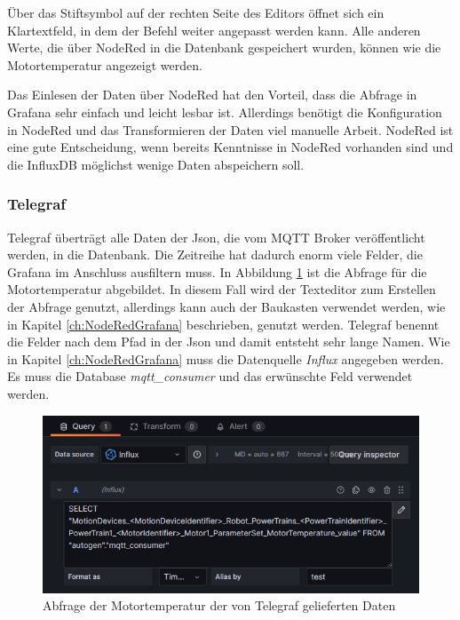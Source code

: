 \documentclass[a4paper, 12pt, oneside, toc=listofnumbered, bibliography=totoc]{scrbook}
\begin{document}
		Über das Stiftsymbol auf der rechten Seite des Editors öffnet sich ein Klartextfeld, in dem der Befehl weiter angepasst werden kann. Alle anderen Werte, die über NodeRed in die Datenbank gespeichert wurden, können wie die Motortemperatur angezeigt werden.
		
		Das Einlesen der Daten über NodeRed hat den Vorteil, dass die Abfrage in Grafana sehr einfach und leicht lesbar ist. Allerdings benötigt die Konfiguration in NodeRed und das Transformieren der Daten viel manuelle Arbeit. NodeRed ist eine gute Entscheidung, wenn bereits Kenntnisse in NodeRed vorhanden sind und die InfluxDB möglichst wenige Daten abspeichern soll. 
		
		\subsubsection{Telegraf}
		
		Telegraf überträgt alle Daten der Json, die vom MQTT Broker veröffentlicht werden, in die Datenbank. Die Zeitreihe hat dadurch enorm viele Felder, die Grafana im Anschluss ausfiltern muss. In Abbildung \ref{fig:telegrafabfrage} ist die Abfrage für die Motortemperatur abgebildet. In diesem Fall wird der Texteditor zum Erstellen der Abfrage genutzt, allerdings kann auch der Baukasten verwendet werden, wie in Kapitel \ref{ch:NodeRedGrafana} beschrieben, genutzt werden. Telegraf benennt die Felder nach dem Pfad in der Json und damit entsteht sehr lange Namen. Wie in Kapitel \ref{ch:NodeRedGrafana} muss die Datenquelle \textit{Influx} angegeben werden. Es muss die Database \textit{mqtt\_consumer} und das erwünschte Feld verwendet werden.
		
		\begin{figure}[H]
			\centering
			\includegraphics[width=0.9\linewidth]{res/TelegrafAbfrage.png}
			\caption{Abfrage der Motortemperatur der von Telegraf gelieferten Daten}
			\label{fig:telegrafabfrage}
		\end{figure}
		
\end{document}

